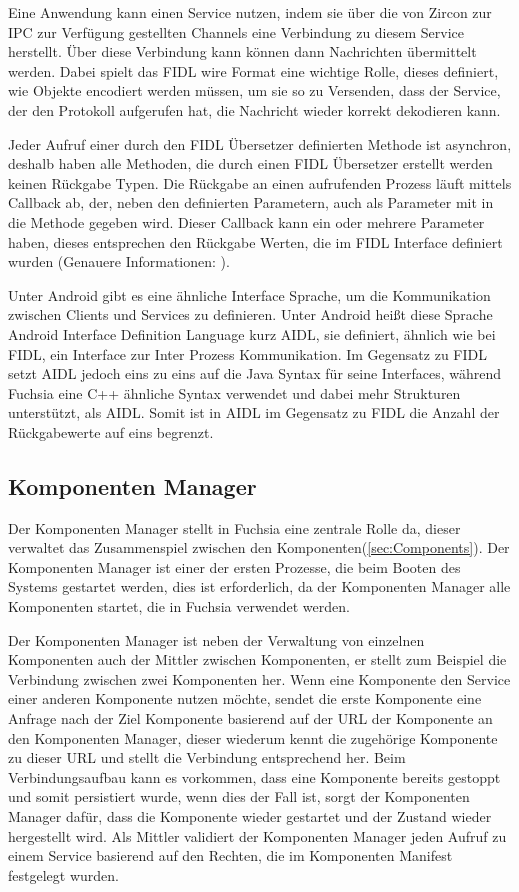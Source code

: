 \documentclass[a4paper]{scrartcl}
\begin{document}
Eine Anwendung kann einen Service nutzen, indem sie über die von Zircon zur IPC zur Verfügung gestellten Channels eine Verbindung zu diesem Service herstellt. Über diese Verbindung kann können dann Nachrichten übermittelt werden. Dabei spielt das FIDL wire Format eine wichtige Rolle, dieses definiert, wie Objekte encodiert werden müssen, um sie so zu Versenden, dass der Service, der den Protokoll aufgerufen hat, die Nachricht wieder korrekt dekodieren kann.

Jeder Aufruf einer durch den FIDL Übersetzer definierten Methode ist asynchron, deshalb haben alle Methoden, die durch einen FIDL Übersetzer erstellt werden keinen Rückgabe Typen. Die Rückgabe an einen aufrufenden Prozess läuft mittels Callback ab, der, neben den definierten Parametern, auch als Parameter mit in die Methode gegeben wird. Dieser Callback kann ein oder mehrere Parameter haben, dieses entsprechen den Rückgabe Werten, die im FIDL Interface definiert wurden (Genauere Informationen: \cite{https://fuchsia.googlesource.com/docs/+/ea2fce2874556205204d3ef70c60e25074dc7ffd/development/languages/fidl/tutorial.md}).

Unter Android gibt es eine ähnliche Interface Sprache, um die Kommunikation zwischen Clients und Services zu definieren. Unter Android heißt diese Sprache Android Interface Definition Language kurz AIDL, sie definiert, ähnlich wie bei FIDL, ein Interface zur Inter Prozess Kommunikation. Im Gegensatz zu FIDL setzt AIDL jedoch eins zu eins auf die Java Syntax für seine Interfaces, während Fuchsia eine C++ ähnliche Syntax verwendet und dabei mehr Strukturen unterstützt, als AIDL. Somit ist in AIDL im Gegensatz zu FIDL die Anzahl der Rückgabewerte auf eins begrenzt.
\subsection{Komponenten Manager}
Der Komponenten Manager stellt in Fuchsia eine zentrale Rolle da, dieser verwaltet das Zusammenspiel zwischen den Komponenten(\ref{sec:Components}). Der Komponenten Manager ist einer der ersten Prozesse, die beim Booten des Systems gestartet werden, dies ist erforderlich, da der Komponenten Manager alle Komponenten startet, die in Fuchsia verwendet werden.

Der Komponenten Manager ist neben der Verwaltung von einzelnen Komponenten auch der Mittler zwischen Komponenten, er stellt zum Beispiel die Verbindung zwischen zwei Komponenten her. Wenn eine Komponente den Service einer anderen Komponente nutzen möchte, sendet die erste Komponente eine Anfrage nach der Ziel Komponente basierend auf der URL der Komponente an den Komponenten Manager, dieser wiederum kennt die zugehörige Komponente zu dieser URL und stellt die Verbindung entsprechend her. Beim Verbindungsaufbau kann es vorkommen, dass eine Komponente bereits gestoppt und somit persistiert wurde, wenn dies der Fall ist, sorgt der Komponenten Manager dafür, dass die Komponente wieder gestartet und der Zustand wieder hergestellt wird. Als Mittler validiert der Komponenten Manager jeden Aufruf zu einem Service basierend auf den Rechten, die im Komponenten Manifest festgelegt wurden.
\end{document}
